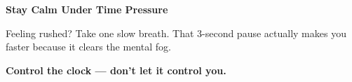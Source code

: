 {\begin{tcolorbox}[
    enhanced,
    colback=funYellowLight,
    colframe=funYellow!60,
    arc=10pt,
    boxrule=1pt,
    left=6mm, right=6mm, top=4mm, bottom=4mm,
]
{\bfseries\color{funYellowDark} \faLightbulb\hspace{2mm}Stay Calm Under Time Pressure}

\vspace{2mm}

Feeling rushed? Take one slow breath. That 3-second pause actually makes you faster because it clears the mental fog.
\end{tcolorbox}

\vspace{4mm}

\begin{center}
{\large\bfseries\color{funOrangeDark} \faClock\hspace{2mm}Control the clock — don't let it control you.\hspace{2mm}\faClock}
\end{center}

}
\newpage
